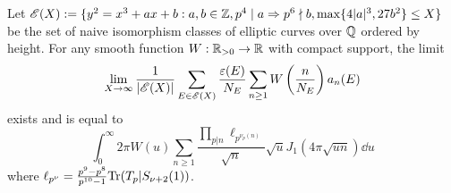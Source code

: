 \begin{theorem}
    Let $\mathscr{E}(X) := \{y^2 = x^3 + ax + b: a, b \in \mathbb{Z}, p^4 \mid a \Rightarrow p^6 \nmid b, \max\{4|a|^3, 27 b^2\} \le X\}$ be the set of naive isomorphism classes of elliptic curves over $\mathbb{Q}$ ordered by height.
    For any smooth function $W : \mathbb{R}_{>0} \to \mathbb{R}$ with compact support, the limit
    \begin{equation}
        \lim_{X \to \infty} \frac{1}{|\mathscr{E}(X)|} \sum_{E \in \mathscr{E}(X)} \frac{\varepsilon(E)}{N_E} \sum_{n \ge 1} W\left(\frac{n}{N_E}\right) a_n(E)
    \end{equation}
    exists and is equal to
    \begin{equation}
        \int_{0}^{\infty} 2 \pi W(u) \sum_{n \ge 1} \frac{\prod_{p | n} \ell_{p^{\nu_p(n)}}}{\sqrt{n}} \sqrt{u} J_1 (4 \pi \sqrt{un}) \dd u
    \end{equation}
    where $\ell_{p^\nu} = \frac{p^9 - p^8}{p^{10} - 1} \mathrm{Tr}(T_p | S_{\nu + 2}(1))$.
\end{theorem}